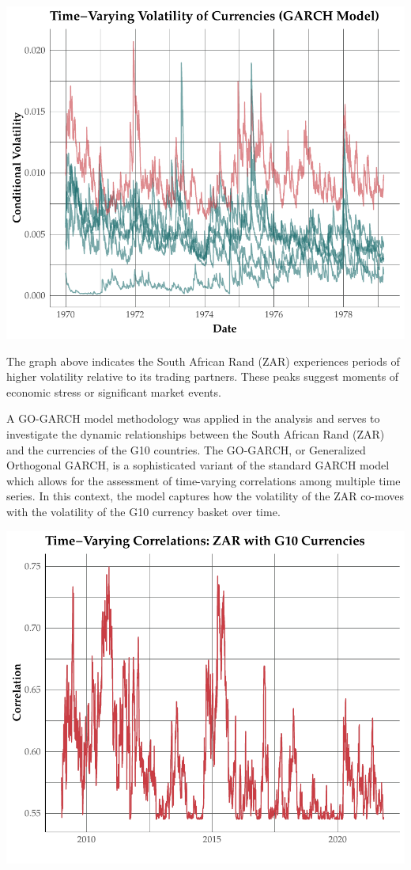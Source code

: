 \documentclass[11pt,preprint, authoryear]{elsarticle}
\numberwithin{equation}{section}
\numberwithin{figure}{section}
\numberwithin{table}{section}
\begin{document}
\includegraphics{Question-5_files/figure-latex/plot-garch-1.pdf}

The graph above indicates the South African Rand (ZAR) experiences
periods of higher volatility relative to its trading partners. These
peaks suggest moments of economic stress or significant market events.

A GO-GARCH model methodology was applied in the analysis and serves to
investigate the dynamic relationships between the South African Rand
(ZAR) and the currencies of the G10 countries. The GO-GARCH, or
Generalized Orthogonal GARCH, is a sophisticated variant of the standard
GARCH model which allows for the assessment of time-varying correlations
among multiple time series. In this context, the model captures how the
volatility of the ZAR co-moves with the volatility of the G10 currency
basket over time.

\includegraphics{Question-5_files/figure-latex/plot-gog-1.pdf}
\end{document}

